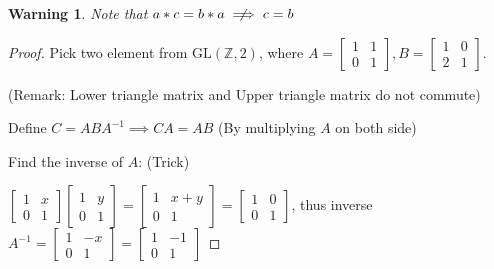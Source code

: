 \documentclass{article}
\theoremstyle{MyNonumberplain}
\theoremstyle{break}
\newtheorem*{proof}{Proof. }
\newtheorem{warning}{Warning}[section]
\theoremstyle{break}
\theoremstyle{break}
\theoremstyle{definition}
\theoremstyle{break}
\begin{document}
\begin{warnbox}
        \begin{warning}
            Note that $a*c=b*a\centernot\implies c=b$
        \end{warning}
        \begin{prfbox}
            \begin{proof}
                
                Pick two element from $\text{GL} (\mathbb{Z}, 2)$, where $A =
                \left[\begin{array}{cc}
                  1 & 1\\
                  0 & 1
                \end{array}\right], B = \left[\begin{array}{cc}
                  1 & 0\\
                  2 & 1
                \end{array}\right]$.\bigskip
                
                (Remark: Lower triangle matrix and Upper triangle matrix do not commute)\bigskip
                
                Define $C = A B A^{- 1} \implies C A = A B$ (By multiplying $A$ on both
                side)\bigskip
                
                Find the inverse of $A$: (Trick)\bigskip
                
                $\left[\begin{array}{cc}
                  1 & x\\
                  0 & 1
                \end{array}\right] \left[\begin{array}{cc}
                  1 & y\\
                  0 & 1
                \end{array}\right] = \left[\begin{array}{cc}
                  1 & x + y\\
                  0 & 1
                \end{array}\right] = \left[\begin{array}{cc}
                  1 & 0\\
                  0 & 1
                \end{array}\right]$, thus inverse $A^{- 1} = \left[\begin{array}{cc}
                  1 & - x\\
                  0 & 1
                \end{array}\right] = \left[\begin{array}{cc}
                  1 & - 1\\
                  0 & 1
                \end{array}\right]$\bigskip
                

\end{proof}
\end{prfbox}
\end{warnbox}
\end{document}

